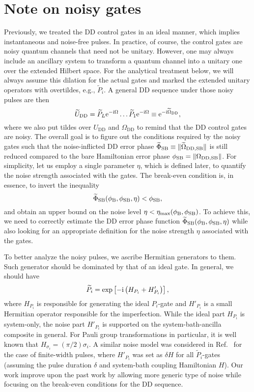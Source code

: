 \documentclass[b5paper,11pt]{article}
\newcommand{\wtP}{\widetilde{P}}
\newcommand{\wtO}{\widetilde{\Omega}}
\newcommand{\wtep}{\widetilde{\Phi}_\mathrm{SB}}
\newcommand{\rDD}{\mathrm{DD}}
\newcommand{\rmax}{\mathrm{max}}
\begin{document}
\section{Note on noisy gates}
Previously, we treated the DD control gates in an ideal manner, which implies instantaneous and noise-free pulses. In practice, of course, the control gates are noisy quantum channels that need not be unitary.
However, one may always include an ancillary system to transform a quantum channel into a unitary one over the extended Hilbert space. For the analytical treatment below, we will always assume this dilation for the actual gates and marked the extended unitary operators with overtildes, e.g., $\wtP_i$. A general DD sequence under those noisy pulses are then 
\begin{equation}\label{eq:noisy-UDD}
 \widetilde{U}_{\mathrm{DD}} =  \wtP_L \upe^{-\upi \Omega}  \ldots  \wtP_1\upe^{-\upi \Omega}\equiv  \upe^{-\upi\wtO_\rDD},
\end{equation}
where we also put tildes over $U_\rDD$ and $\Omega_\rDD$ to remind that the DD control gates are noisy. 
The overall goal is to figure out the conditions required by the noisy gates such that the noise-inflicted DD error phase $\wtep \equiv \norm{\wtO_{\rDD,\rSB}}$  is still reduced compared to the bare Hamiltonian error phase $\phi_\rSB = \norm{\Omega_{\rDD,\rSB}}$. For simplicity, let us employ a single parameter $\eta$, which is defined later,  to quantify the noise strength associated with the gates.  The break-even condition is, in essence, to invert the inequality
\begin{equation}
 \wtep(\phi_\rB,\phi_\rSB,\eta) < \phi_\rSB,
\end{equation} 
and obtain an upper bound on the noise level $\eta<\eta_{\rmax}(\phi_\rB, \phi_\rSB)$.
To achieve this, we need to correctly estimate the DD error phase function $\wtep(\phi_\rB,\phi_\rSB,\eta)$ while also looking for an appropriate definition for the noise strength $\eta$ associated with the gates.  

To better analyze the noisy pulses, we ascribe Hermitian generators to them. Such generator should be dominated by that of an ideal gate. In general, we should have 
\begin{equation}\label{eq:pulse-hami}
 \widetilde{P}_i= \exp\left[ -\mathrm{i} \left( H_{P_i} + H'_{P_i} \right)  \right],
\end{equation}
where $H_{P_i}$ is responsible for generating the ideal $P_i$-gate and $H'_{P_i}$ is a small Hermitian operator responsible for the imperfection. While the ideal part $H_{P_i}$ is system-only, the noise part $H'_{P_i}$ is supported on the system-bath-ancilla composite in general. For Pauli group transformations in particular, it is well known that $H_{\sigma_i} = (\pi/2)\sigma_i$. A similar noise model was considered in Ref.~\!\cite{khodjasteh2007performance} for the case of finite-width pulses, where $ H'_{P_i} $ was set as $\delta H$ for all $\wtP_i$-gates (assuming the pulse duration $\delta$ and system-bath coupling Hamiltonian $H$). Our work improve upon the past work by allowing more generic type of noise while focusing on the break-even conditions for the DD sequence. 
\end{document}
